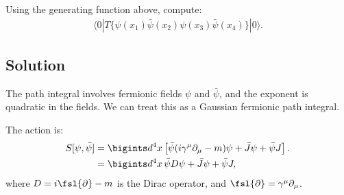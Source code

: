 Using the generating function above, compute:
\begin{align}
    \langle 0 | T \{ \psi(x_1) \bar{\psi}(x_2) \psi(x_3) \bar{\psi}(x_4) \} | 0 \rangle.
\end{align}
\bigskip\bigskip\hline\hline\bigskip
\subsection*{Solution}
The path integral involves fermionic fields $\psi$ and $\bar{\psi}$, and the exponent is quadratic in the fields. We can treat this as a Gaussian fermionic path integral.

The action is:
\begin{align}
    S[\psi, \bar{\psi}] &= \bigints d^4x \left[ \bar{\psi} (i \gamma^\mu \partial_\mu - m) \psi + \bar{J} \psi + \bar{\psi} J \right].\notag\\
    &= \bigints d^4x \, \bar{\psi} D \psi + \bar{J} \psi + \bar{\psi} J,
\end{align}
where $D = i \fsl{\partial} - m$ is the Dirac operator, and $\fsl{\partial} = \gamma^\mu \partial_\mu$.

